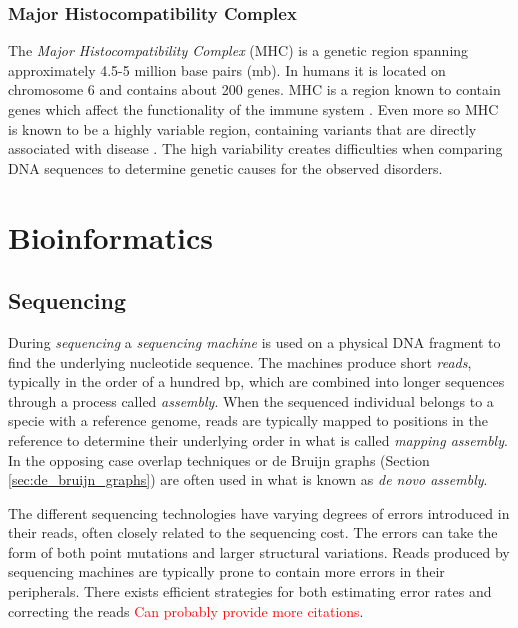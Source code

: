 \documentclass[thesis.tex]{subfiles}
\begin{document}
\subsubsection{Major Histocompatibility Complex}
\label{sec:mhc}
The \textit{Major Histocompatibility Complex} (MHC) is a genetic region spanning approximately 4.5-5 million base pairs (mb)\cite{improved_genome_inference_in_the_mhc_using_a_population_reference_graph}\cite{canonical_stable_general_mapping_using_context_schemes}. In humans it is located on chromosome 6 and contains about 200 genes. MHC is a region known to contain genes which affect the functionality of the immune system \cite{the_importance_of_immune_gene_variability_in_evolutionary_ecology_and_conservation}. Even more so MHC is known to be a highly variable region, containing variants that are directly associated with disease \cite{variation_analysis_and_gene_annotation_of_eight_mhc_haplotypes}. The high variability creates difficulties when comparing DNA sequences to determine genetic causes for the observed disorders.
\section{Bioinformatics}
\subsection{Sequencing}
\label{sec:sequencing}
During \textit{sequencing} a \textit{sequencing machine} is used on a physical DNA fragment to find the underlying nucleotide sequence. The machines produce short \textit{reads}, typically in the order of a hundred bp\cite{sequencing_platforms}, which are combined into longer sequences through a process called \textit{assembly}. When the sequenced individual belongs to a specie with a reference genome, reads are typically mapped to positions in the reference to determine their underlying order in what is called \textit{mapping assembly}. In the opposing case overlap techniques\cite{an_eulerian_path_approach_to_dna_fragment_assembly} or de Bruijn graphs (Section \ref{sec:de_bruijn_graphs}) are often used in what is known as \textit{de novo assembly}\cite[Chapter 1, p. 19]{introduction_to_genomics}.\\
\par\noindent
The different sequencing technologies have varying degrees of errors introduced in their reads, often closely related to the sequencing cost\cite{sequencing_platforms}. The errors can take the form of both point mutations and larger structural variations. Reads produced by sequencing machines are typically prone to contain more errors in their peripherals. There exists efficient strategies for both estimating error rates \cite{estimation_of_sequencing_error_rates_in_short_reads} and correcting the reads\cite{error_correction_of_datasets_with_non_uniform_coverage} \textcolor{red}{Can probably provide more citations}.
\end{document}
